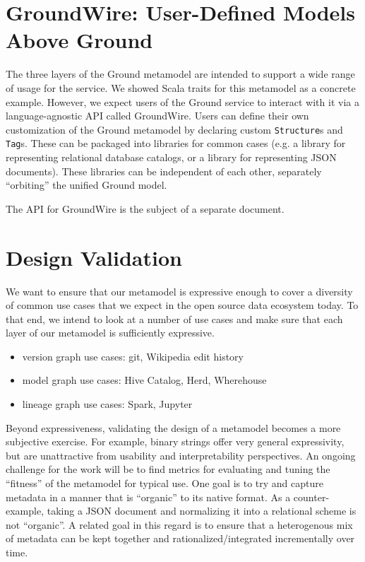 \documentclass{article}
\newcommand{\structure}{\texttt{Structure}\xspace}
\newcommand{\tag}{\texttt{Tag}\xspace}
\newcommand{\versiongraph}{version graph\xspace}
\newcommand{\modelgraph}{model graph\xspace}
\newcommand{\lineagegraph}{lineage graph\xspace}
\newcommand{\groundwire}{GroundWire\xspace}
\begin{document}
\section{\groundwire: User-Defined Models Above Ground}
The three layers of the Ground metamodel are intended to support a wide range of usage for the service.  We 
showed Scala traits for this metamodel as a concrete example.  However, we expect users of the Ground
service to interact with it via a language-agnostic API called \groundwire.  Users can define their own
customization of the Ground metamodel by declaring custom {\structure}s and {\tag}s.  
These can be packaged into libraries for common cases (e.g. a library for representing
relational database catalogs, or a library for representing JSON documents).  These libraries can 
be independent of each other, separately ``orbiting'' the unified Ground model.  

The API for \groundwire is the subject of a separate document.

\section{Design Validation}
We want to ensure that our metamodel is expressive enough to cover a diversity of common use cases that we expect in the open source data ecosystem today.  
To that end, we intend to look at a number of use cases and make sure that each layer of our metamodel is sufficiently expressive. 


\begin{itemize}
\item \versiongraph use cases: git, Wikipedia edit history

\item \modelgraph use cases: Hive Catalog, Herd, Wherehouse

\item \lineagegraph use cases: Spark, Jupyter
\end{itemize}

Beyond expressiveness, validating the design of a metamodel becomes a more subjective exercise.  For example, binary strings offer very general expressivity, but are unattractive from usability and interpretability perspectives.  An ongoing challenge for the work will be to find metrics for evaluating and tuning the ``fitness'' of the metamodel for typical use.  One goal is to try and capture metadata in a manner that is ``organic'' to its native format.  As a counter-example, taking a JSON document and normalizing it into a relational scheme is not ``organic''. A related goal in this regard is to ensure that a heterogenous mix of metadata can be kept together and rationalized/integrated incrementally over time.
\end{document}
